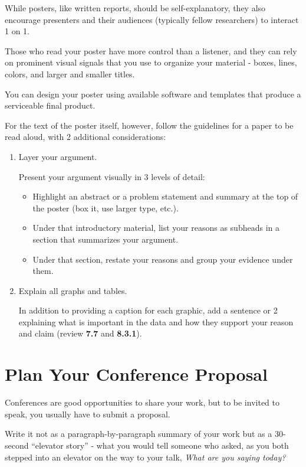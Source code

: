 \documentclass[oneside]{book}
\numberwithin{equation}{section}
\begin{document}
While posters, like written reports, should be self-explanatory, they also encourage presenters and their audiences (typically fellow researchers) to interact 1 on 1.

Those who read your poster have more control than a listener, and they can rely on prominent visual signals that you use to organize your material - boxes, lines, colors, and larger and smaller titles.

%
You can design your poster using available software and templates that produce a serviceable final product.

For the text of the poster itself, however, follow the guidelines for a paper to be read aloud, with 2 additional considerations:
\begin{enumerate}
    \item Layer your argument.
    
    Present your argument visually in 3 levels of detail:
    \begin{itemize}
        \item Highlight an abstract or a problem statement and summary at the top of the poster (box it, use larger type, etc.).
        \item Under that introductory material, list your reasons as subheads in a section that summarizes your argument.
        \item Under that section, restate your reasons and group your evidence under them.
    \end{itemize}
    \item Explain all graphs and tables.
    
    In addition to providing a caption for each graphic, add a sentence or 2 explaining what is important in the data and how they support your reason and claim (review \textbf{7.7} and \textbf{8.3.1}).
\end{enumerate}

\section{Plan Your Conference Proposal}
Conferences are good opportunities to share your work, but to be invited to speak, you usually have to submit a proposal.

Write it not as a paragraph-by-paragraph summary of your work but as a 30-second ``elevator story'' - what you would tell someone who asked, as you both stepped into an elevator on the way to your talk, \textit{What are you saying today?}
\end{document}
